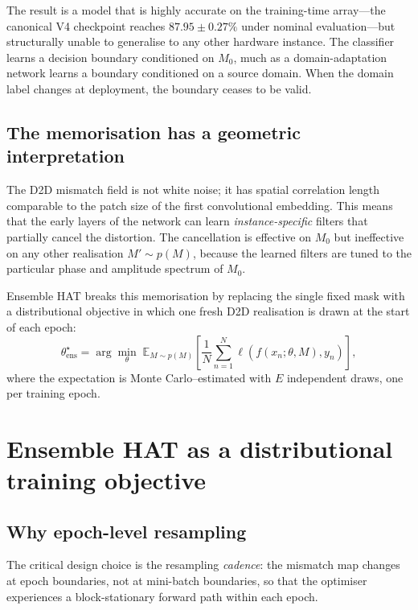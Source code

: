 The result is a model that is highly accurate on the training-time array---the canonical V4 checkpoint reaches $87.95\pm0.27\%$ under nominal evaluation---but structurally unable to generalise to any other hardware instance.  The classifier learns a decision boundary conditioned on $M_{0}$, much as a domain-adaptation network learns a boundary conditioned on a source domain.  When the domain label changes at deployment, the boundary ceases to be valid.

\subsection{The memorisation has a geometric interpretation}

The D2D mismatch field is not white noise; it has spatial correlation length comparable to the patch size of the first convolutional embedding.  This means that the early layers of the network can learn \emph{instance-specific} filters that partially cancel the distortion.  The cancellation is effective on $M_{0}$ but ineffective on any other realisation $M' \sim p(M)$, because the learned filters are tuned to the particular phase and amplitude spectrum of $M_{0}$.

Ensemble HAT breaks this memorisation by replacing the single fixed mask with a distributional objective in which one fresh D2D realisation is drawn at the start of each epoch:
\begin{equation}
    \theta_{\mathrm{ens}}^{\star} = \arg\min_{\theta} \; \mathbb{E}_{M \sim p(M)}\!\left[\frac{1}{N}\sum_{n=1}^{N}\ell\!\left(f(x_{n};\theta,M),y_{n}\right)\right],
    \label{eq:ensemble-hat-ch1}
\end{equation}
where the expectation is Monte Carlo--estimated with $E$ independent draws, one per training epoch.


\section{Ensemble HAT as a distributional training objective}
\label{sec:ch1-ensemble-hat}

\subsection{Why epoch-level resampling}

The critical design choice is the resampling \emph{cadence}: the mismatch map changes at epoch boundaries, not at mini-batch boundaries, so that the optimiser experiences a block-stationary forward path within each epoch.

